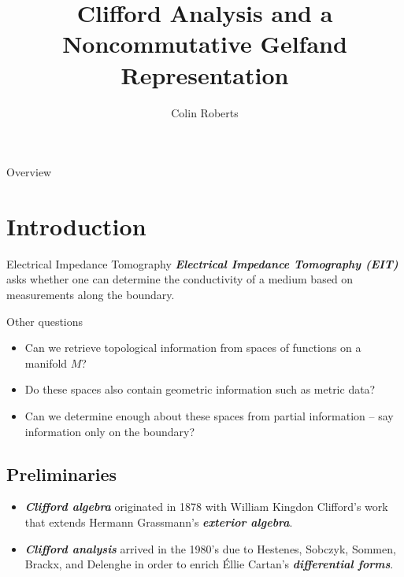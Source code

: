 \documentclass[aspectratio=169,handout]{beamer}
\author{Colin Roberts}
\title{Clifford Analysis and a Noncommutative Gelfand Representation}
\subtitle{}
\newcommand\boldgreen[1]{\textcolor{lighter_csu_green}{\emph{\textbf{#1}}}}
\begin{document}
\begin{frame}{Overview}
\tableofcontents
\end{frame}

\section{Introduction}

\begin{frame}{Electrical Impedance Tomography}
\vfill
\boldgreen{Electrical Impedance Tomography (EIT)} asks whether one can determine the conductivity of a medium based on measurements along the boundary.
\vfill
\end{frame}

\begin{frame}{Other questions}
\vfill 
    \begin{itemize}
        \pause 
        \item Can we retrieve topological information from spaces of functions on a manifold $M$?

        \pause
        \item Do these spaces also contain geometric information such as metric data?

        \pause
        \item Can we determine enough about these spaces from partial information -- say information only on the boundary?
    \end{itemize}
\vfill
\end{frame}

\subsection{Preliminaries}

\begin{frame}{}
\vfill
\begin{itemize}
    \pause
    \item \boldgreen{Clifford algebra} originated in 1878 with William Kingdon Clifford's work that extends Hermann Grassmann's \boldgreen{exterior algebra}.
    \pause
    \item \boldgreen{Clifford analysis} arrived in the 1980's due to Hestenes, Sobczyk, Sommen, Brackx, and Delenghe in order to enrich \'Ellie Cartan's \boldgreen{differential forms}.
\end{itemize}
\vfill
\end{frame}
\end{document}
